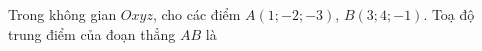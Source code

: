 \begin{ex}
Trong không gian $Oxyz$, cho các điểm $A(1;-2;-3)$, $B(3;4;-1)$. Toạ độ trung điểm của đoạn thẳng $AB$ là
\end{ex}
